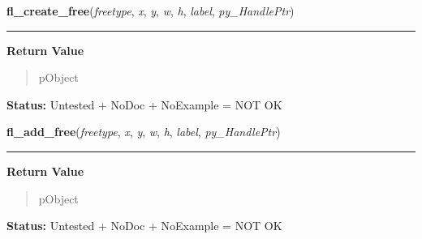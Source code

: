     \label{xformslib:library:fl_create_free}

    \vspace{0.5ex}

\hspace{.8\funcindent}\begin{boxedminipage}{\funcwidth}

    \raggedright \textbf{fl\_create\_free}(\textit{freetype}, \textit{x}, \textit{y}, \textit{w}, \textit{h}, \textit{label}, \textit{py\_HandlePtr})

    \vspace{-1.5ex}

    \rule{\textwidth}{0.5\fboxrule}
\setlength{\parskip}{2ex}
\setlength{\parskip}{1ex}
      \textbf{Return Value}
    \vspace{-1ex}

      \begin{quote}
      pObject

      \end{quote}

\textbf{Status:} Untested + NoDoc + NoExample = NOT OK



    \end{boxedminipage}

    \label{xformslib:library:fl_add_free}

    \vspace{0.5ex}

\hspace{.8\funcindent}\begin{boxedminipage}{\funcwidth}

    \raggedright \textbf{fl\_add\_free}(\textit{freetype}, \textit{x}, \textit{y}, \textit{w}, \textit{h}, \textit{label}, \textit{py\_HandlePtr})

    \vspace{-1.5ex}

    \rule{\textwidth}{0.5\fboxrule}
\setlength{\parskip}{2ex}
\setlength{\parskip}{1ex}
      \textbf{Return Value}
    \vspace{-1ex}

      \begin{quote}
      pObject

      \end{quote}

\textbf{Status:} Untested + NoDoc + NoExample = NOT OK



    \end{boxedminipage}

